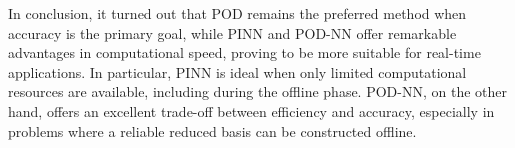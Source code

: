 \documentclass[
    conference,
    nofonttune,
    11pt
]{IEEEtran}
\begin{document}
        In conclusion, it turned out that POD remains the preferred method when accuracy is the primary goal, while PINN and POD-NN offer remarkable advantages in computational speed, proving to be more suitable for real-time applications. In particular, PINN is ideal when only limited computational resources are available, including during the offline phase. POD-NN, on the other hand, offers an excellent trade-off between efficiency and accuracy, especially in problems where a reliable reduced basis can be constructed offline.
    
%

    
    
    \nocite{*}
\end{document}
